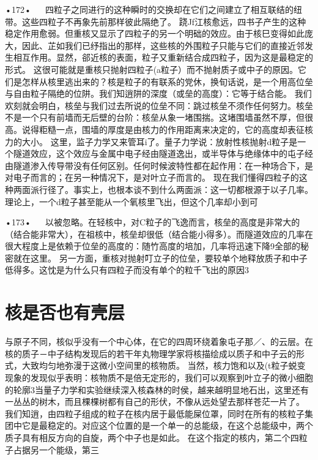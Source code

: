 •172•
  
四粒子之同进行的这种瞬时的交换却在它们之间建立了相互联结的纽带。这些四粒子不再象先前那样彼此隔绝了。
跷Jf江核愈远，四书子产生的这种稳定作用愈弱。但重核又显示了四粒子的另一个明础的效应。由于核巳变得如此庞大，因此、芷如我们已纾指出的那样，这些核的外围粒子只能与它们的直接近邻发生相互作用。显然，郤近核的表面，粒子又重新结合成四粒子，因为这是最稳定的形式。
这很可能就是重核只抛射四粒子(a粒子）而不抛射质子或中子的原因。它们是怎样从核里逃出来的？核是粒子的有联系的党休，换旬话说，是一个用高位垒与自由粒子隔绝的位阱。我们知逍阱的深度（或垒的高度）：它等于结合能。
我们欢刻就会明白，核垒与我们过去所说的位垒不同：跳过核垒不须作任何努力。核垒不是一个只有前墙而无后壁的台阶：核垒从象一堵围揣。这堵围墙虽然不厚，但很高。说得粔糙一点，围墙的厚度是由核力的作用距离来决定的，它的高度却表征核力的大小。
这里，监子力学又来管耳i了。量子力学说：放射性核抛射d粒子是一个隧道效应，这个效应与金属中电子经由隧道逸出，或半导体与绝缘体中的屯子经由隧道渗入传导带没有任何区别。任何时候波特性都在起作用：在一种场合下，是对电子而言的；在另一种情况下，是对叶立子而言的。
现在我们懂得四粒子的这种两面派行径了。事实上，也根本谈不到什么两面派：这一切都根源于以子几率。理论上，一个d粒子甚至能从一个氧核里飞出，但这个几率却小到可

•173•
  
以被忽略。在轻核中，对C粒子的飞逸而言，核垒的高度是非常大的（结合能非常大），在祖核中，核垒却很低（结合能小得多）。而隧道效应的几率在很大程度上是依赖于位垒的高度的：随竹高度的培加，几率将迅速下降9全部的秘密就在这里。
另一方面，重核对抛射叮立子的位垒，要较单个地释放质子和中子低得多。这忱是为什么只有四粒子而没有单个的粒千飞出的原因3

\section{核是否也有壳层}

与原子不同，核似乎没有一个中心体，在它的四周环绕着象屯子那／、的云层。在核的质子－中子结构发现后的若干年丸物理学家将核描绘成以质子和中子云的形式，大致均匀地弥漫于这微小空间里的核物质。
当然，核力饱和以及(t粒子蜕变现象的发现似乎表明：核物质不是倍无定形的，我们可以观察到叶立子的微小细胞的轮廓3当量子力学和实验继续深入核森林的时侯，越来越明显地石出，这里还有一丛丛的树木，而且棵棵树都有自己的形伏，不像从远处望去那样苍茫一片了。
我们知逍，由四粒子组成的粒子在核内居于最低能屎位罩，同时在所有的核粒子集团中它是最稳定的。对应这个位置的是一个单一的总能级，在这个总能级中，两个质子具有相反方向的自旋，两个中子也是如此。
在这个指定的核内，第二个四粒子占据另一个能级，第三

